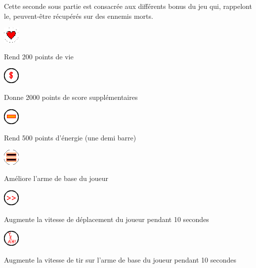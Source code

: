 \par\par Cette seconde sous partie est consacrée aux différents bonus du jeu qui, rappelont le, peuvent-être récupérés sur des ennemis morts.

\begin{center}
\par \includegraphics{images/bonus/bonusVie.png} 
\par Rend 200 points de vie
\vspace{0.8cm}
\par \includegraphics{images/bonus/bonusScore.png} 
\par Donne 2000 points de score supplémentaires
\vspace{0.8cm}
\par \includegraphics{images/bonus/bonusEnergie.png}
\par Rend 500 points d'énergie (une demi barre)
\vspace{0.8cm}
\par \includegraphics{images/bonus/bonusBaseWeapon.png}
\par Améliore l'arme de base du joueur
\par \includegraphics{images/bonus/bonusSpeed.png} 
\par Augmente la vitesse de déplacement du joueur pendant 10 secondes
\vspace{0.8cm}
\par \includegraphics{images/bonus/bonusSpeedAttack.png} 
\par Augmente la vitesse de tir sur l'arme de base du joueur pendant 10 secondes
\vspace{0.8cm}
\end{center}